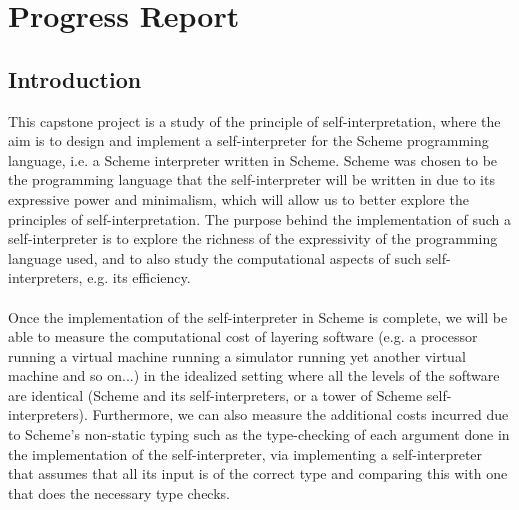 \chapter{Progress Report} %

\label{chapter1} %

\section{Introduction}
This capstone project is a study of the principle of self-interpretation, where the aim is to design and implement a self-interpreter for the Scheme programming language, i.e. a Scheme interpreter written in Scheme. 
Scheme was chosen to be the programming language that the self-interpreter will be written in due to its expressive power and minimalism, which will allow us to better explore the principles of self-interpretation. 
The purpose behind the implementation of such a self-interpreter is to explore the richness of the expressivity of the programming language used, and to also study the computational aspects of such self-interpreters, 
e.g. its efficiency. 
\\
\\
Once the implementation of the self-interpreter in Scheme is complete, we will be able to measure the computational cost of layering software 
(e.g. a processor running a virtual machine running a simulator running yet another virtual machine and so on...) in the idealized setting where all the levels of the software are identical 
(Scheme and its self-interpreters, or a tower of Scheme self-interpreters). Furthermore, we can also measure the additional costs incurred due to Scheme’s non-static typing such as the type-checking of each 
argument done in the implementation of the self-interpreter, via implementing a self-interpreter that assumes that all its input is of the correct type and comparing this with one that does the necessary type checks.

